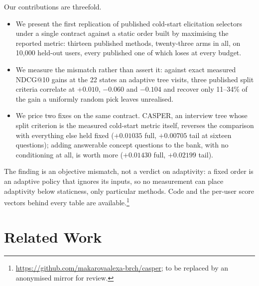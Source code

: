 \documentclass[runningheads]{llncs}
\begin{document}
\noindent Our contributions are threefold.
\begin{itemize}
\item We present the first replication of published cold-start elicitation selectors under a single
contract against a static order built by maximising the reported metric: thirteen published methods,
twenty-three arms in all, on 10{,}000 held-out users, every published one of which loses at every budget.
\item We measure the mismatch rather than assert it: against exact measured NDCG@10 gains at the 22
states an adaptive tree visits, three published split criteria correlate at $+0.010$, $-0.060$ and
$-0.104$ and recover only 11--34\% of the gain a uniformly random pick leaves unrealised.
\item We price two fixes on the same contract. CASPER, an interview tree whose split criterion is
the measured cold-start metric itself, reverses the comparison with everything else held fixed
($+0.01035$ full, $+0.00705$ tail at sixteen questions); adding answerable concept questions to the
bank, with no conditioning at all, is worth more ($+0.01430$ full, $+0.02199$ tail).
\end{itemize}

The finding is an objective mismatch, not a verdict on adaptivity: a fixed order is an adaptive
policy that ignores its inputs, so no measurement can place adaptivity below staticness, only
particular methods. Code and the per-user score vectors behind every table are
available.\footnote{\url{https://github.com/makarovaalexa-brch/casper}; to be replaced by an anonymised mirror for review.}

\section{Related Work}
\label{sec:rw}
\end{document}
